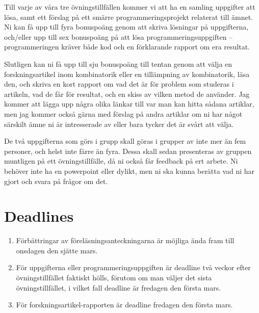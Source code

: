 \documentclass[nobib]{tufte-handout}
\begin{document}
Till varje av våra tre övningstillfällen kommer vi att ha en samling uppgifter att lösa, samt ett förslag på ett smärre programmeringsprojekt relaterat till ämnet. Ni kan få upp till fyra bonuspoäng genom att skriva lösningar på uppgifterna, och/eller upp till sex bonuspoäng på att lösa programmeringsuppgiften -- programmeringen kräver både kod och en förklarande rapport om era resultat.

Slutligen kan ni få upp till sju bonuspoäng till tentan genom att välja en forskningsartikel inom kombinatorik eller en tillämpning av kombinatorik, läsa den, och skriva en kort rapport om vad det är för problem som studeras i artikeln, vad de får för resultat, och en skiss av vilken metod de använder. Jag kommer att lägga upp några olika länkar till var man kan hitta sådana artiklar, men jag kommer också gärna med förslag på andra artiklar om ni har något särskilt ämne ni är intresserade av eller bara tycker det är svårt att välja.

De två uppgifterna som görs i grupp skall göras i grupper av inte mer än fem personer, och helst inte färre än fyra. Dessa skall sedan presenteras av gruppen muntligen på ett övningstillfälle, då ni också får feedback på ert arbete. Ni behöver inte ha en powerpoint eller dylikt, men ni ska kunna berätta vad ni har gjort och svara på frågor om det.

\section{Deadlines}

\begin{enumerate}
	\item Förbättringar av föreläsningsanteckningarna är möjliga ända fram till onsdagen den sjätte mars.
	\item För uppgifterna eller programmeringsuppgiften är deadline två veckor efter övningstillfället faktiskt hölls, förutom om man väljer det sista övningstillfället, i vilket fall deadline är fredagen den första mars.
	\item För forskningsartikel-rapporten är deadline fredagen den första mars.
\end{enumerate}
\end{document}
